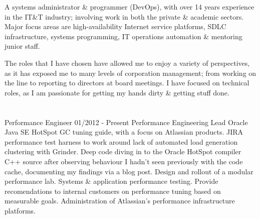 
A {\mb systems administrator} \& {\mb programmer} (DevOps), with over 14 years experience in the IT\&T industry; involving work in both the private \& academic sectors. Major focus areas are high-availability Internet service platforms, SDLC infrastructure, systems programming, IT operations automation \& mentoring junior staff.

The roles that I have chosen have allowed me to enjoy a variety of perspectives, as it has exposed me to many levels of corporation management; from working on the line to reporting to directors at board meetings. I have focused on technical roles, as I am passionate for getting my hands dirty \& getting stuff done.


\section{\ATL}

\lskip
{} Performance Engineer
 01/2012 - Present
 Performance Engineering Lead
 Oracle Java SE HotSpot GC tuning guide, with a focus on Atlassian products.
\dashtopic JIRA performance test harness to work around lack of automated load generation clustering with Grinder.
\dashtopic Deep code diving in to the Oracle HotSpot compiler C++ source after observing behaviour I hadn't seen previously with the code cache, documenting my findings via a blog post.
\dashtopic Design and rollout of a modular performance lab. 
 Systems \& application performance testing.
\dashtopic Provide recomendations to internal customers on performance tuning based on measurable goals.
\dashtopic Administration of Atlassian's performance infrastructure platforms.
\pskip

